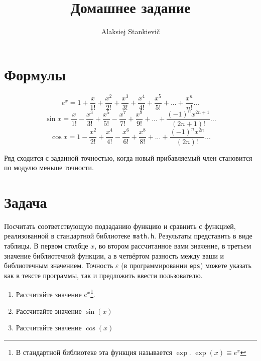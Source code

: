 \documentclass[12pt]{article}
\author{Alaksiej Stankievič}
\title{Домашнее задание}
\begin{document}


\section{Формулы}
\begin{equation}
 e^x = 1 + \frac{x}{1!}+\frac{x^2}{2!}+\frac{x^3}{3!}+\frac{x^4}{4!}+\frac{x^5}{5!}+...+\frac{x^n}{n!}...
\end{equation}
\begin{equation}
 \sin{x} = \frac{x}{1!}-\frac{x^3}{3!}+\frac{x^5}{5!}-\frac{x^7}{7!}+\frac{x^9}{9!}+...+\frac{(-1)^{n}x^{2n+1}}{(2n+1)!}...
\end{equation}
\begin{equation}
 \cos{x} = 1 - \frac{x^2}{2!}+\frac{x^4}{4!}-\frac{x^6}{6!}+\frac{x^8}{8!}+...+\frac{(-1)^{n}x^{2n}}{(2n)!}...
\end{equation}

Ряд сходится с заданной точностью, когда новый прибавляемый член становится по модулю меньше точности.

\section{Задача}
Посчитать соответствующую подзаданию функцию и сравнить с функцией, реализованной в стандартной библиотеке \verb|math.h|. Результаты представить в виде таблицы. В первом столбце $x$, во втором рассчитанное вами значение, в третьем значение библиотечной функции, а в четвёртом разность между ваши и библиотечным значением. Точность $\varepsilon$ (в программировании \verb|eps|) можете указать как в тексте программы, так и предложить ввести пользователю.

\begin{enumerate}
 \item Рассчитайте значение $e^x$\footnote{В стандартной библиотеке эта функция называется $\exp$. $\exp(x) \equiv e^x$}.
 \item Рассчитайте значение $\sin(x)$
 \item Рассчитайте значение $\cos(x)$
\end{enumerate}
\end{document}
